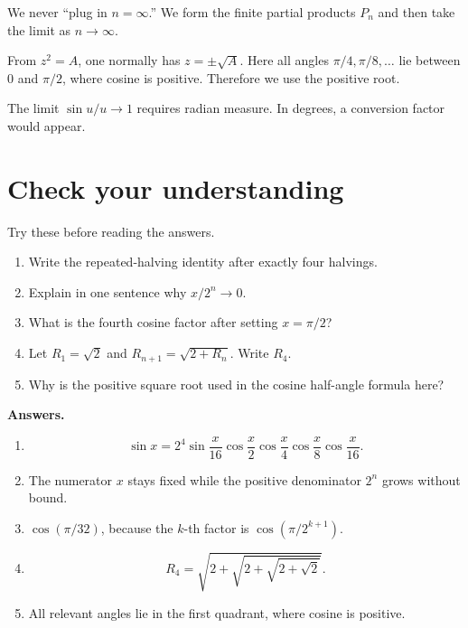 \documentclass[11pt]{article}
\begin{document}
\begin{warningBox}
We never ``plug in \(n=\infty\).'' We form the finite partial products \(P_n\) and then take the limit as \(n\to\infty\).
\end{warningBox}

\begin{warningBox}
From \(z^2=A\), one normally has \(z=\pm\sqrt A\). Here all angles \(\pi/4,\pi/8,\ldots\) lie between \(0\) and \(\pi/2\), where cosine is positive. Therefore we use the positive root.
\end{warningBox}

\begin{warningBox}
The limit \(\sin u/u\to1\) requires radian measure. In degrees, a conversion factor would appear.
\end{warningBox}

\section{Check your understanding}

Try these before reading the answers.

\begin{enumerate}
  \item Write the repeated-halving identity after exactly four halvings.
  \item Explain in one sentence why \(x/2^n\to0\).
  \item What is the fourth cosine factor after setting \(x=\pi/2\)?
  \item Let \(R_1=\sqrt2\) and \(R_{n+1}=\sqrt{2+R_n}\). Write \(R_4\).
  \item Why is the positive square root used in the cosine half-angle formula here?
\end{enumerate}

\textbf{Answers.}
\begin{enumerate}
  \item
  \[
    \sin x=2^4\sin\frac{x}{16}
    \cos\frac{x}{2}\cos\frac{x}{4}
    \cos\frac{x}{8}\cos\frac{x}{16}.
  \]
  \item The numerator \(x\) stays fixed while the positive denominator \(2^n\) grows without bound.
  \item \(\cos(\pi/32)\), because the \(k\)-th factor is \(\cos(\pi/2^{k+1})\).
  \item
  \[
    R_4=\sqrt{2+\sqrt{2+\sqrt{2+\sqrt2}}}.
  \]
  \item All relevant angles lie in the first quadrant, where cosine is positive.
\end{enumerate}
\end{document}
